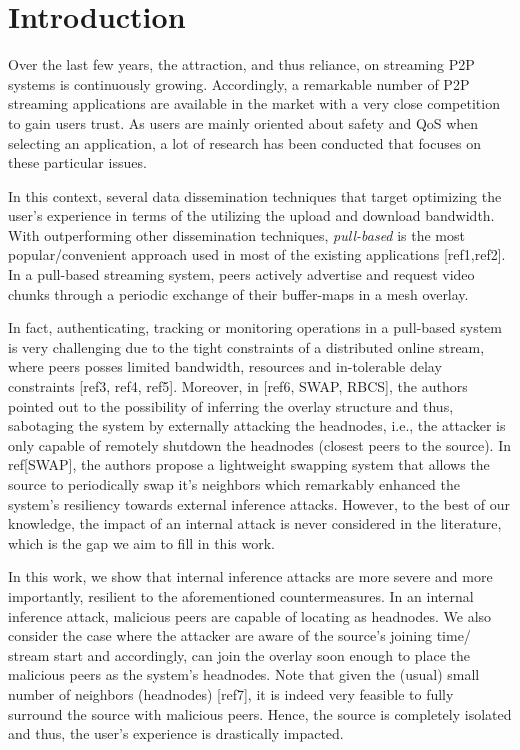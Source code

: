 \section{Introduction}
\label{sec:intro}

Over the last few years, the attraction, and thus reliance, on streaming P2P systems is continuously growing. 
Accordingly, a remarkable number of P2P streaming applications are available in the market with a very close competition to gain users trust.
As users are mainly oriented about safety and QoS when selecting an application, a lot of research has been conducted that focuses on these particular issues.

In this context, several data dissemination techniques that target optimizing the user's experience in terms of the utilizing the upload and download bandwidth.
With outperforming other dissemination techniques, \textit{pull-based} is the most popular/convenient approach used in most of the existing applications [ref1,ref2].
In a pull-based streaming system, peers actively advertise and request video chunks through a periodic exchange of their buffer-maps in a mesh overlay.

In fact, authenticating, tracking or monitoring operations in a pull-based system is very challenging due to the tight constraints of a distributed online stream, where peers posses limited bandwidth, resources and in-tolerable delay constraints [ref3, ref4, ref5].
Moreover, in [ref6, SWAP, RBCS], the authors pointed out to the possibility of inferring the overlay structure and thus, sabotaging the system by externally attacking the headnodes, i.e., the attacker is only capable of remotely shutdown the headnodes (closest peers to the source).
In ref[SWAP], the authors propose a lightweight swapping system that allows the source to periodically swap it's neighbors which remarkably enhanced the system's resiliency towards external inference attacks.
However, to the best of our knowledge, the impact of an internal attack is never considered in the literature, which is the gap we aim to fill in this work.

In this work, we show that internal inference attacks are more severe and more importantly, resilient to the aforementioned countermeasures.
In an internal inference attack, malicious peers are capable of locating as headnodes.
We also consider the case where the attacker are aware of the source's joining time/ stream start and accordingly, can join the overlay soon enough to place the malicious peers as the system's headnodes.
Note that given the (usual) small number of neighbors (headnodes) [ref7], it is indeed very feasible to fully surround the source with malicious peers.
Hence, the source is completely isolated and thus, the user's experience is drastically impacted.

